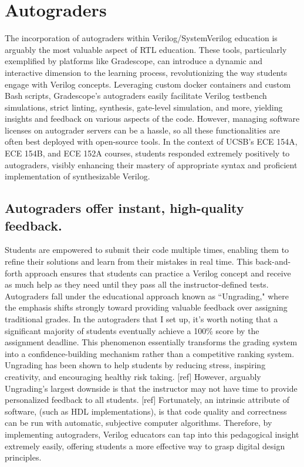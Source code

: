 
\chapter{Autograders}
\label{chapter:autograders}

The incorporation of autograders within Verilog/SystemVerilog education is arguably the most valuable aspect of RTL education. These tools, particularly exemplified by platforms like Gradescope, can introduce a dynamic and interactive dimension to the learning process, revolutionizing the way students engage with Verilog concepts. Leveraging custom docker containers and custom Bash scripts, Gradescope's autograders easily facilitate Verilog testbench simulations, strict linting, synthesis, gate-level simulation, and more, yielding insights and feedback on various aspects of the code. However, managing software licenses on autograder servers can be a hassle, so all these functionalities are often best deployed with open-source tools. In the context of UCSB's ECE 154A, ECE 154B, and ECE 152A courses, students responded extremely positively to autograders, visibly enhancing their mastery of appropriate syntax and proficient implementation of synthesizable Verilog.

\section{Autograders offer instant, high-quality feedback.}

Students are empowered to submit their code multiple times, enabling them to refine their solutions and learn from their mistakes in real time. This back-and-forth approach ensures that students can practice a Verilog concept and receive as much help as they need until they pass all the instructor-defined tests. Autograders fall under the educational approach known as ``Ungrading," where the emphasis shifts strongly toward providing valuable feedback over assigning traditional grades. In the autograders that I set up, it's worth noting that a significant majority of students eventually achieve a 100\% score by the assignment deadline. This phenomenon essentially transforms the grading system into a confidence-building mechanism rather than a competitive ranking system. Ungrading has been shown to help students by reducing stress, inspiring creativity, and encouraging healthy risk taking. [ref] However, arguably Ungrading's largest downside is that the instructor may not have time to provide personalized feedback to all students. [ref] Fortunately, an intrinsic attribute of software, (such as HDL implementations), is that code quality and correctness can be run with automatic, subjective computer algorithms. Therefore, by implementing autograders, Verilog educators can tap into this pedagogical insight extremely easily, offering students a more effective way to grasp digital design principles.

